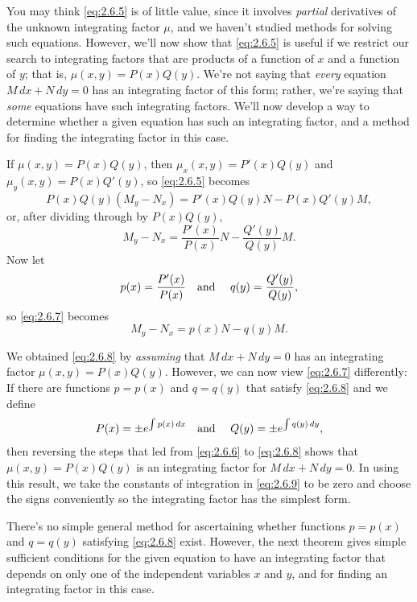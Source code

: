 You may think \eqref{eq:2.6.5} is of little value, since it involves {\color{blue}\it partial\/}
derivatives of the unknown integrating factor $\mu$, and we haven't studied methods for solving such
equations. However, we'll now show that \eqref{eq:2.6.5} is useful if we restrict our search to
integrating factors that are products of a function of $x$ and a function of $y$; that is,
$\mu(x,y)=P(x)Q(y)$. We're not saying that {\color{blue}\it every\/} equation $M\,dx+N\,dy=0$ has an
integrating factor of this form; rather, we're saying that {\color{blue}\it some\/} equations have
such integrating factors. We'll now develop a way to determine whether a given equation has such an
integrating factor, and a method for finding the integrating factor in this case.

If $\mu(x,y)=P(x)Q(y)$, then $\mu_{x}(x,y)=P'(x)Q(y)$ and $\mu_{y}(x,y)=P(x)Q'(y)$, so
\eqref{eq:2.6.5} becomes
\begin{equation}
  \label{eq:2.6.6}P(x)Q(y)(M_{y}-N_{x})=P'(x)Q(y)N-P(x)Q'(y)M,
\end{equation}
or, after dividing through by $P(x)Q(y)$,
\begin{equation}
  \label{eq:2.6.7}M_{y}-N_{x}=\frac{P'(x)}{P(x)}N-\frac{Q'(y)}{Q(y)}M.
\end{equation}
Now let
\[
  p(x)=\frac{P'(x)}{P(x)}\mbox{\quad and \quad}q(y)=\frac{Q'(y)}{Q(y)},
\]
so \eqref{eq:2.6.7} becomes
\begin{equation}
  \label{eq:2.6.8}M_{y}-N_{x}=p(x)N-q(y)M.
\end{equation}

We obtained \eqref{eq:2.6.8} by {\color{blue}\it assuming\/} that $M\,dx+N\,dy=0$ has an integrating
factor $\mu(x,y)=P(x)Q(y)$. However, we can now view \eqref{eq:2.6.7} differently: If there are
functions $p=p(x)$ and $q=q(y)$ that satisfy \eqref{eq:2.6.8} and we define
\begin{equation}
  \label{eq:2.6.9}P(x)=\pm e^{\int p(x)\,dx}\mbox{\quad and \quad}Q(y)=\pm e^{\int q(y)\,dy},
\end{equation}
then reversing the steps that led from \eqref{eq:2.6.6} to \eqref{eq:2.6.8} shows that
$\mu(x,y)=P(x)Q(y)$ is an integrating factor for $M\,dx+N\,dy=0$. In using this result, we take the
constants of integration in \eqref{eq:2.6.9} to be zero and choose the signs conveniently so the
integrating factor has the simplest form.

There's no simple general method for ascertaining whether functions $p=p(x)$ and $q=q(y)$ satisfying
\eqref{eq:2.6.8} exist. However, the next theorem gives simple sufficient conditions for the given
equation to have an integrating factor that depends on only one of the independent variables $x$ and
$y$, and for finding an integrating factor in this case.

